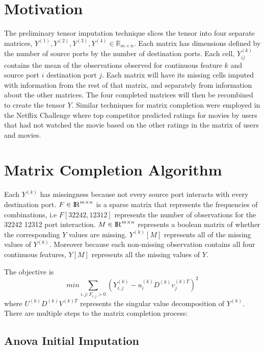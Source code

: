 \documentclass[12pt,twoside]{dukestatscithesis}
\theoremstyle{definition}
\theoremstyle{definition}
\theoremstyle{definition}
\theoremstyle{remark}
\begin{document}
\section{Motivation}\label{motivation-1}

The preliminary tensor imputation technique slices the tensor into four
separate matrices,
\(Y^{(1)}, Y^{(2)}, Y^{(3)}, Y^{(4)} \in \mathbb{R}_{m \times n}\). Each
matrix has dimensions defined by the number of source ports by the
number of destination ports. Each cell, \(Y^{(k)}_{ij}\) contains the
mean of the observations observed for continuous feature \(k\) and
source port \(i\) destination port \(j\). Each matrix will have its
missing cells imputed with information from the rest of that matrix, and
separately from information about the other matrices. The four completed
matrices will then be recombined to create the tensor \(Y\). Similar
techniques for matrix completion were employed in the Netflix Challenge
where top competitor predicted ratings for movies by users that had not
watched the movie based on the other ratings in the matrix of users and
movies.

\section{Matrix Completion Algorithm}\label{matrix-completion-algorithm}

Each \(Y^{(k)}\) has missingness because not every source port interacts
with every destination port. \(F \in {\rm I\!R}^{m \times n}\) is a
sparse matrix that represents the frequencies of combinations, i.e
\(F[32242,12312]\) represents the number of observations for the 32242
12312 port interaction. \(M \in {\rm I\!R}^{m \times n}\) represents a
boolean matrix of whether the corresponding \(Y\) values are missing.
\(Y^{(k)}[M]\) represents all of the missing values of \(Y^{(k)}\).
Moreover because each non-missing observation contains all four
continuous features, \(Y[M]\) represents all the missing values of
\(Y\).

The objective is
\[min \sum_{i,j:F_{i,j} > 0} (Y^{(k)}_{i,j} - u^{(k)}_iD^{(k)}v^{(k)T}_j)^2\]
where \(U^{(k)}D^{(k)}V^{(k)T}\) represents the singular value
decomposition of \(Y^{(k)}\). There are multiple steps to the matrix
completion process:

\subsection{Anova Initial Imputation}\label{anova-initial-imputation}
\end{document}
